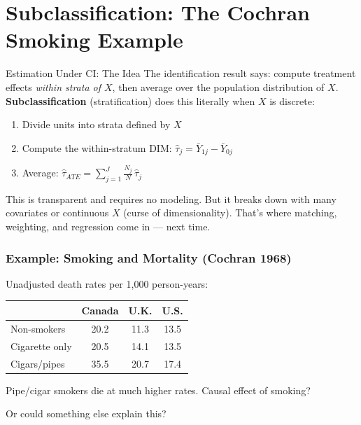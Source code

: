 \documentclass[xcolor=dvipsnames]{beamer}
\begin{document}
\section{Subclassification: The Cochran Smoking Example}

\begin{frame}{Estimation Under CI: The Idea}
\small
{} The identification result says: compute treatment effects \textit{within strata of $X$}, then average over the population distribution of $X$.\\

\medskip
{} \textbf{Subclassification} (stratification) does this literally when $X$ is discrete:
\begin{enumerate}
\footnotesize
\item Divide units into strata defined by $X$
\item Compute the within-stratum DIM: $\hat\tau_j = \bar Y_{1j} - \bar Y_{0j}$
\item Average: $\hat\tau_{ATE} = \sum_{j=1}^J \frac{N_j}{N}\, \hat\tau_j$
\end{enumerate}

\bigskip
{} This is transparent and requires no modeling.  But it breaks down with many covariates or continuous $X$ (curse of dimensionality).  That's where matching, weighting, and regression come in --- next time.
\end{frame}


\begin{frame}
  \frametitle{Example: Smoking and Mortality (Cochran 1968)}
\small
Unadjusted death rates per 1,000 person-years:

\begin{center}
\begin{tabular}{@{} l c c c @{}}
\toprule
 & Canada & U.K. & U.S.\\
\midrule
Non-smokers     & 20.2 & 11.3 & 13.5 \\
Cigarette only  & 20.5 & 14.1 & 13.5 \\
Cigars/pipes    & 35.5 & 20.7 & 17.4 \\
\bottomrule
\end{tabular}
\end{center}

\bigskip
{} Pipe/cigar smokers die at much higher rates.  Causal effect of smoking?

 \medskip
Or could something else explain this?
\end{frame}
\end{document}
